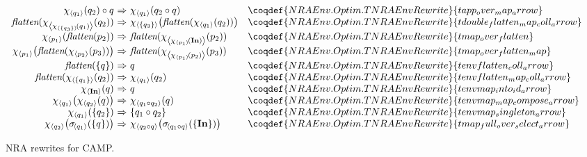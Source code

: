\begin{figure*}[hb]
\begin{minipage}{0.50\linewidth}
\[\begin{array}{r@{\ }c@{\ }ll}
        \qmap{q_1}{q_2} \circ q & \Rightarrow & \qmap{q_1}{q_2 \circ q}
        & \coqdef{NRAEnv.Optim.TNRAEnvRewrite}{tapp_over_map_arrow}
        \\
        \opflatten(\qmap{\qmap{\{ q_3 \}}{q_1}}{q_2}) & \Rightarrow & \qmap{\{ q_3 \}}{\opflatten(\qmap{q_1}{q_2})}
        & \coqdef{NRAEnv.Optim.TNRAEnvRewrite}{tdouble_flatten_map_coll_arrow}
        \\
        \qmap{p_1}{\opflatten(p_2)} & \Rightarrow & \opflatten(\qmap{\qmap{p_1}{\qID}}{p_2})
        & \coqdef{NRAEnv.Optim.TNRAEnvRewrite}{tmap_over_flatten}
        \\
        \qmap{p_1}{\opflatten(\qmap{p_2}{p_3})} & \Rightarrow & \opflatten(\qmap{\qmap{p_1}{p_2}}{p_3})
        & \coqdef{NRAEnv.Optim.TNRAEnvRewrite}{tmap_over_flatten_map}
        \\
        \opflatten(\{ q \}) & \Rightarrow & q
        & \coqdef{NRAEnv.Optim.TNRAEnvRewrite}{tenvflatten_coll_arrow}
        \\
        \opflatten(\qmap{\{ q_1 \}}{q_2}) & \Rightarrow & \qmap{q_1}{q_2}
        & \coqdef{NRAEnv.Optim.TNRAEnvRewrite}{tenvflatten_map_coll_arrow}
        \\
        \qmap{\qID}{q} & \Rightarrow & q
        & \coqdef{NRAEnv.Optim.TNRAEnvRewrite}{tenvmap_into_id_arrow}
        \\
        \qmap{q_1}{\qmap{q_2}{q}} & \Rightarrow & \qmap{q_1 \circ q_2}{q}
        & \coqdef{NRAEnv.Optim.TNRAEnvRewrite}{tenvmap_map_compose_arrow}
        \\
        \qmap{q_1}{\{ q_2 \}} & \Rightarrow & \{ q_1 \circ q_2 \}
        & \coqdef{NRAEnv.Optim.TNRAEnvRewrite}{tenvmap_singleton_arrow}
        \\
        \qmap{q_2}{\qselect{q_1}{\{ q \}}} & \Rightarrow & \qmap{q_2 \circ q}{\qselect{q_1 \circ q}{\{ \qID \}}}
        & \coqdef{NRAEnv.Optim.TNRAEnvRewrite}{tmap_full_over_select_arrow}
        \\
      \end{array}
     \]
  \end{minipage}
 \vspace*{1.5mm}
  \caption{NRA rewrites for CAMP.}
  \label{tab:rewrites-nra}
\end{figure*}


